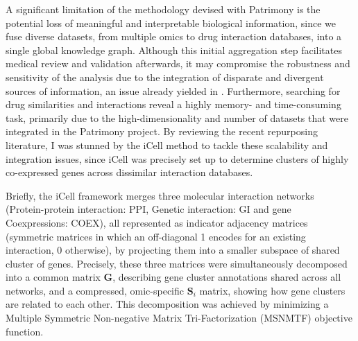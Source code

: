 A significant limitation of the methodology devised with Patrimony is the potential loss of meaningful and interpretable biological information, since we fuse diverse datasets, from multiple omics to drug interaction databases, into a single global knowledge graph. Although this initial aggregation step facilitates medical review and validation afterwards, it may compromise the robustness and sensitivity of the analysis due to the integration of disparate and divergent sources of information, an issue already yielded in . Furthermore, searching for drug similarities and interactions reveal a highly memory- and time-consuming task, primarily due to the high-dimensionality and number of datasets that were integrated in the Patrimony project. By reviewing the recent repurposing literature, I was stunned by the iCell method \autocite{malod-dognin_etal19} to tackle these scalability and integration issues, since iCell was precisely set up to determine clusters of highly co-expressed genes across dissimilar interaction databases.

Briefly, the iCell framework merges three molecular interaction networks (Protein-protein interaction: PPI, Genetic interaction: GI and gene Coexpressions: COEX), all represented as indicator adjacency matrices (symmetric matrices in which an off-diagonal 1 encodes for an existing interaction, 0 otherwise), by projecting them into a smaller subspace of shared cluster of genes. Precisely, these three matrices were simultaneously decomposed into a common matrix $\boldsymbol{G}$, describing gene cluster annotations shared across all networks, and a compressed, omic-specific $\boldsymbol{S}_i$ matrix, showing how gene clusters are related to each other. This decomposition was achieved by minimizing a Multiple Symmetric Non-negative Matrix Tri-Factorization (MSNMTF) objective function.

